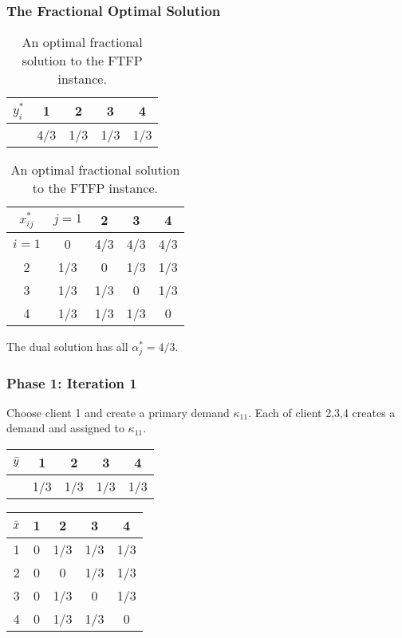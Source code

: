 \documentclass[hyperref, xcolor=dvipsnames]{beamer}
\begin{document}
\begin{frame}
  \frametitle{The Fractional Optimal Solution}
  \begin{table}
    \begin{subtable}{0.5\textwidth}
      \centering
      \begin{tabular}{c | c c c c}
        $y_i^\ast$ & 1 & 2 & 3 & 4\\
        \hline
        & 4/3 & 1/3 & 1/3 & 1/3\\
      \end{tabular}
      \subcaption{}
    \end{subtable}
%
    \begin{subtable}{0.5\textwidth}
      \centering
      \begin{tabular}{c | c c c c}
        $x_{ij}^\ast$ & $j=1$ & 2 & 3 & 4\\
        \hline
        $i=1$ & 0 & 4/3 & 4/3 & 4/3\\
        2 & 1/3 & 0 & 1/3 & 1/3\\
        3 & 1/3 & 1/3 & 0 & 1/3\\
        4 & 1/3 & 1/3 & 1/3 & 0\\
      \end{tabular}
      \subcaption{}
    \end{subtable}
    \caption{An optimal fractional solution to the FTFP instance.}
\end{table}

The dual solution has all $\alpha_j^\ast = 4/3$.
\end{frame}

\begin{frame}
  \frametitle{Phase 1: Iteration 1} 

  Choose client 1 and create a primary demand $\kappa_{11}$. Each of
  client 2,3,4 creates a demand and assigned to $\kappa_{11}$.
  \begin{table}
  \begin{subtable}{0.5\textwidth}
    \centering
    \begin{tabular}{c | c c c c}
      ${\bar y}$ & 1 & 2 & 3 & 4\\
      \hline
      & 1/3 & 1/3 & 1/3 & 1/3\\
    \end{tabular}
  \end{subtable}
%
  \begin{subtable}{0.5\textwidth}
    \centering
    \begin{tabular}{c | c c c c}
      ${\bar x}$ & 1 & 2 & 3 & 4\\
      \hline
      1 & 0 & 1/3 & 1/3 & 1/3\\
      2 & 0 & 0 & 1/3 & 1/3\\
      3 & 0 & 1/3 & 0 & 1/3\\
      4 & 0 & 1/3 & 1/3 & 0\\
    \end{tabular}
  \end{subtable}
\end{table}
\end{frame}
\end{document}
